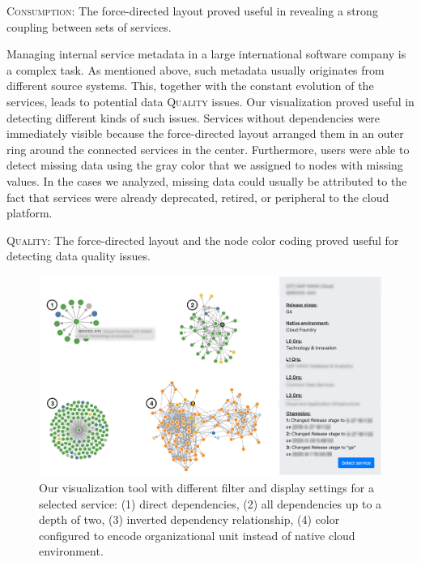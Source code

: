 \documentclass[conference]{IEEEtran}
\newcommand{\ExampleService}{\textit{Service 815}}
\begin{document}
\begin{roundedbox}
\noindent\textsc{Consumption}: The force-directed layout proved useful in revealing a strong coupling between sets of services.
\end{roundedbox}

Managing internal service metadata in a large international software company is a complex task. As mentioned above, such metadata usually originates from different source systems. This, together with the constant evolution of the services, leads to potential data \textsc{Quality} issues.
Our visualization proved useful in detecting different kinds of such issues.
Services without dependencies were immediately visible because the force-directed layout arranged them in an outer ring around the connected services in the center.
Furthermore, users were able to detect missing data using the gray color that we assigned to nodes with missing values.
In the cases we analyzed, missing data could usually be attributed to the fact that services were already deprecated, retired, or peripheral to the cloud platform.

\begin{roundedbox}
\noindent\textsc{Quality}: The force-directed layout and the node color coding proved useful for detecting data quality issues.
\end{roundedbox}

\begin{figure}
    \centering
    \includegraphics[width=\linewidth,trim=0 0 0 0,clip]{figures/service-815-collection-anonymized-clean.png}
    \caption{Our visualization tool with different filter and display settings for a selected service: (1) direct dependencies, %
    (2) all dependencies up to a depth of two, (3) inverted dependency relationship, (4) color configured to encode organizational unit instead of native cloud environment.} %
    \label{fig:service-815-viz}
\end{figure}
\end{document}
